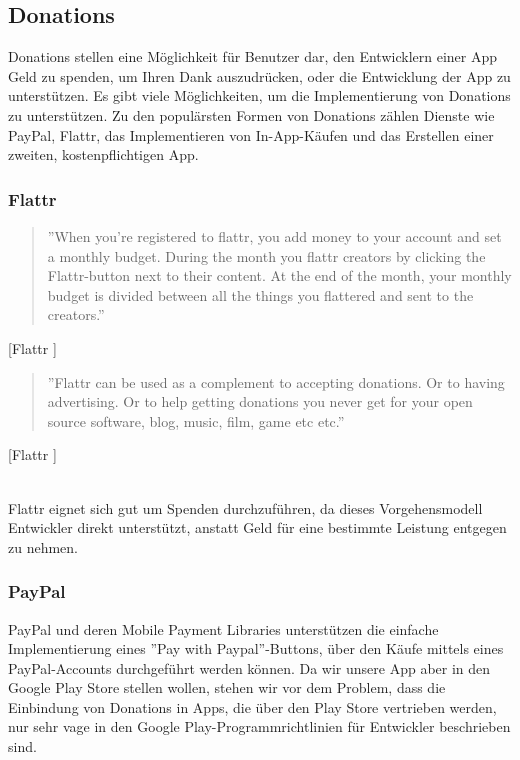 \documentclass[FIPLY_base.tex]{subfiles}
\begin{document}
\subsection{Donations}
Donations stellen eine Möglichkeit für Benutzer dar, den Entwicklern einer App Geld zu spenden, um Ihren Dank auszudrücken, oder die Entwicklung der App zu unterstützen.
Es gibt viele Möglichkeiten, um die Implementierung von Donations zu unterstützen.\newline
Zu den populärsten Formen von Donations zählen Dienste wie PayPal, Flattr, das Implementieren von In-App-Käufen und das Erstellen einer zweiten, kostenpflichtigen App. %


\subsubsection{Flattr}
\begin{quote}
''When you're registered to flattr, you add money to your account and set a monthly budget. During the month you flattr creators by clicking the Flattr-button next to their content. At the end of the month, your monthly budget is divided between all the things you flattered and sent to the creators.''
\end{quote}[Flattr \cite{flattr}]

\begin{quote}
''Flattr can be used as a complement to accepting donations. Or to having advertising. Or to help getting donations you never get for your open source software, blog, music, film, game etc etc.''
\end{quote}[Flattr \cite{flattr}]

\ \\
Flattr eignet sich gut um Spenden durchzuführen, da dieses Vorgehensmodell Entwickler direkt unterstützt, anstatt Geld für eine bestimmte Leistung entgegen zu nehmen. 

\newpage
\subsubsection{PayPal}
PayPal und deren Mobile Payment Libraries unterstützen die einfache Implementierung eines ''Pay with Paypal''-Buttons, über den Käufe mittels eines PayPal-Accounts durchgeführt werden können.
Da wir unsere App aber in den Google Play Store stellen wollen, stehen wir vor dem Problem, dass die Einbindung von Donations in Apps, die über den Play Store vertrieben werden, nur sehr vage in den Google Play-Programmrichtlinien für Entwickler beschrieben sind.
\end{document}
